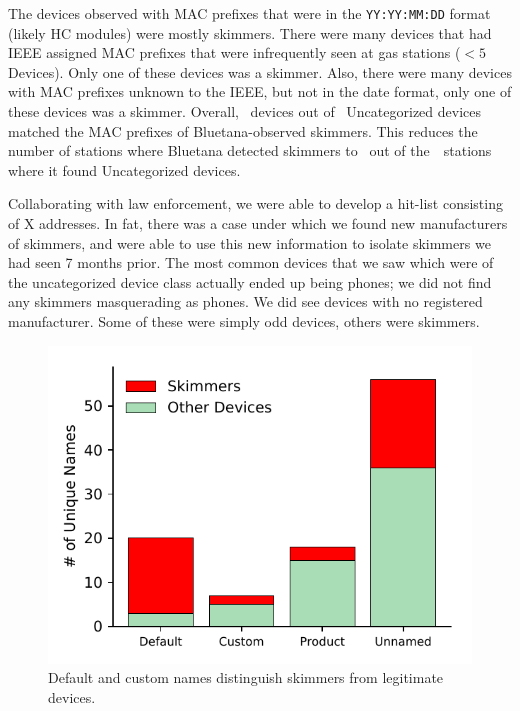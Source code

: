 The devices observed with MAC prefixes that were in the \texttt{YY:YY:MM:DD}
format (likely HC modules) were mostly skimmers.
%
There were many devices that had IEEE assigned MAC prefixes that were
infrequently seen at gas stations ($<5$ Devices). Only one of these devices
was a skimmer.
%
Also, there were many devices with MAC prefixes unknown to the IEEE, but not in
the date format, only one of these devices was a skimmer.
%
Overall, \numberBTMACCoDfiltered~devices out of
\numberbtuncategorized~Uncategorized devices matched the MAC prefixes of
Bluetana-observed skimmers.
%
This reduces the number of stations where Bluetana detected skimmers to
\visitedstationsMACCoDfiltered~out of the~\totaluncatstation~stations where it found
Uncategorized devices.



%
%
%
%
%

Collaborating with law
enforcement, we were able to develop a hit-list consisting of X addresses. In
fat, there was a case under which we found new manufacturers of skimmers, and
were able to use this new information to isolate skimmers we had seen 7 months
prior. The most common devices that we saw which were of the uncategorized
device class actually ended up being phones; we did not find any skimmers
masquerading as phones. We did see devices with no registered manufacturer. Some
of these were simply odd devices, others were skimmers.
\fi
\begin{figure}[!h]
    \centering
    \captionsetup{justification=centering}
    \includegraphics[width=0.6\linewidth]{skimmer/plots/uncat_visit_hist_device_name.pdf}
    \caption{
    \label{fig:hist_device_name}
    Default and custom names distinguish skimmers from legitimate devices.
    }
\end{figure}


